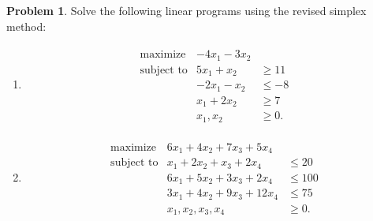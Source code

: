 \documentclass[12pt]{article}
\theoremstyle{definition}
\newtheorem{problem}{Problem}
\begin{document}
\begin{problem}
  Solve the following linear programs using the revised simplex method:
  \begin{enumerate}
    \item
      \begin{align*}
        \begin{array}{rrl}
          \text{maximize} & -4x_1 -3x_2 &\\
          \text{subject to} &5x_1 + x_2 &\geq 11 \\
          & -2x_1 - x_2 &\leq -8 \\
          & x_1 + 2x_2 &\geq 7 \\
          & x_1, x_2 &\geq 0.
        \end{array}
      \end{align*}
    \item
      \begin{align*}
        \begin{array}{rrl}
          \text{maximize} & 6x_1 + 4x_2 + 7x_3 + 5x_4  &\\
          \text{subject to}
          & x_1 + 2x_2 + x_3 + 2x_4 &\leq 20 \\
          & 6x_1 + 5x_2 + 3x_3 + 2x_4 &\leq 100 \\
          & 3x_1 + 4x_2 + 9x_3 + 12x_4 &\leq 75 \\
          & x_1, x_2, x_3, x_4 &\geq 0.
        \end{array}
      \end{align*}
  \end{enumerate}
\end{problem}
\end{document}
